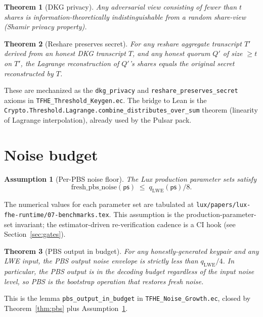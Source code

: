 \documentclass[11pt,a4paper]{article}
\newtheorem{theorem}{Theorem}[section]
\newtheorem{assumption}{Assumption}[section]
\begin{document}
\begin{theorem}[DKG privacy]\label{thm:dkg-privacy}
Any adversarial view consisting of fewer than $t$ shares is
information-theoretically indistinguishable from a random
share-view (Shamir privacy property).
\end{theorem}

\begin{theorem}[Reshare preserves secret]\label{thm:reshare}
For any reshare aggregate transcript $T'$ derived from an honest
DKG transcript $T$, and any honest quorum $Q'$ of size $\geq t$
on $T'$, the Lagrange reconstruction of $Q'$'s shares equals the
original secret reconstructed by $T$.
\end{theorem}

These are mechanized as the \texttt{dkg\_privacy} and
\texttt{reshare\_preserves\_secret} axioms in
\texttt{TFHE\_Threshold\_Keygen.ec}. The bridge to Lean is the
\texttt{Crypto.Threshold.Lagrange.combine\_distributes\_over\_sum}
theorem (linearity of Lagrange interpolation), already used by the
Pulsar pack.

\section{Noise budget}\label{sec:noise}

\begin{assumption}[Per-PBS noise floor]\label{ass:fresh-pbs-noise}
The Lux production parameter sets satisfy
\[
  \mathrm{fresh\_pbs\_noise}(\mathsf{ps})
  \;\leq\; q_{\mathrm{LWE}}(\mathsf{ps}) / 8.
\]
\end{assumption}

The numerical values for each parameter set are tabulated at
\texttt{lux/papers/lux-fhe-runtime/07-benchmarks.tex}. This
assumption is the production-parameter-set invariant; the
estimator-driven re-verification cadence is a CI hook (see
Section~\ref{sec:gates}).

\begin{theorem}[PBS output in budget]\label{thm:pbs-budget}
For any honestly-generated keypair and any LWE input, the PBS
output noise envelope is strictly less than
$q_{\mathrm{LWE}}/4$. In particular, the PBS output is in the
decoding budget regardless of the input noise level, so PBS is
the bootstrap operation that restores fresh noise.
\end{theorem}

This is the lemma \texttt{pbs\_output\_in\_budget} in
\texttt{TFHE\_Noise\_Growth.ec}, closed by Theorem~\ref{thm:pbs}
plus Assumption~\ref{ass:fresh-pbs-noise}.
\end{document}
